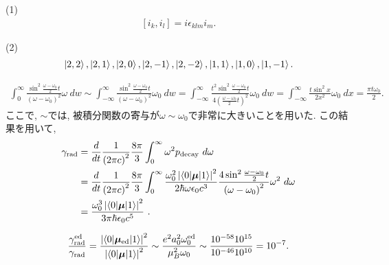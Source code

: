 \begin{ex}
    \label{ex7.28}
    (1)\
    \begin{align*}
        \left[ i_k, i_l\right] = i \epsilon_{klm}i_m.
    \end{align*}
    \par
    (2)
    \begin{align*}
        \ket{2,2}, \ket{2,1}, \ket{2,0}, \ket{2,-1}, \ket{2,-2},
        \ket{1,1}, \ket{1,0}, \ket{1,-1}.
    \end{align*}
\end{ex}

\begin{ex}
    \label{ex7.29}
    \begin{align*}
        \int_0^\infty
        \frac
        {\sin^2\frac{\omega - \omega_0}{2}t}
        {\left(\omega - \omega_0\right)^2}
        \omega
        \ dw
        \sim
        \int_{-\infty}^\infty
        \frac
        {\sin^2\frac{\omega - \omega_0}{2}t}
        {\left(\omega - \omega_0\right)^2}
        \omega_0
        \ dw
        =
        \int_{-\infty}^\infty
        \frac
        {t^2\sin^2\frac{\omega - \omega_0}{2}t}
        { 4\left(\frac{\omega - \omega_0}{2}t\right)^2}
        \omega_0
        \ dw
        =
        \int_{-\infty}^\infty
        \frac
        {t\sin^2 x}
        { 2x^2}
        \omega_0
        \ dx
        =
        \frac{\pi t \omega_0}{2}.
    \end{align*}
    ここで, $\sim$では, 被積分関数の寄与が$\omega \sim \omega_0$で非常に大きいことを用いた. この結果を用いて,
    \begin{align*}
        \gamma_\mathrm{rad}
         & =
        \frac{d}{dt} \frac{1}{\left( 2 \pi c\right)^2}\frac{8 \pi}{3}
        \int_0^\infty \omega^2 p_\mathrm{decay} \ d\omega
        \\
         & =
        \frac{d}{dt}
        \frac{1}{\left( 2 \pi c\right)^2}\frac{8 \pi}{3}
        \int_0^\infty
        \frac{\omega_0^2 \left| \braket{0|\bm{\mu}|1} \right|^2}{2 \hbar \omega \epsilon_0 c^3}
        \frac{4\sin^2\frac{\omega - \omega_0}{2}t}{\left(\omega - \omega_0\right)^2}
        \omega^2
        \ d\omega                                                                                      \\
         & = \frac{\omega_0^3  \left| \braket{0|\bm{\mu}|1} \right|^2 }{3 \pi \hbar \epsilon_0 c^5}\ .
    \end{align*}
\end{ex}

\begin{ex}
    \label{ex7.30}
    \begin{align*}
        \frac{\gamma_\mathrm{rad}^\mathrm{ed} }{\gamma_\mathrm{rad}}
        =
        \frac{\left| \braket{0|\bm{\mu}_\mathrm{ed}|1} \right|^2}{\left| \braket{0|\bm{\mu}|1} \right|^2}
        \sim
        \frac{e^2 a_0^2 \omega_0^\mathrm{ed}}{\mu_B^2 \omega_0}
        \sim
        \frac{10^{-58} 10^{15}}{10^{-46} 10^{10}} = 10^{-7}.
    \end{align*}
\end{ex}

